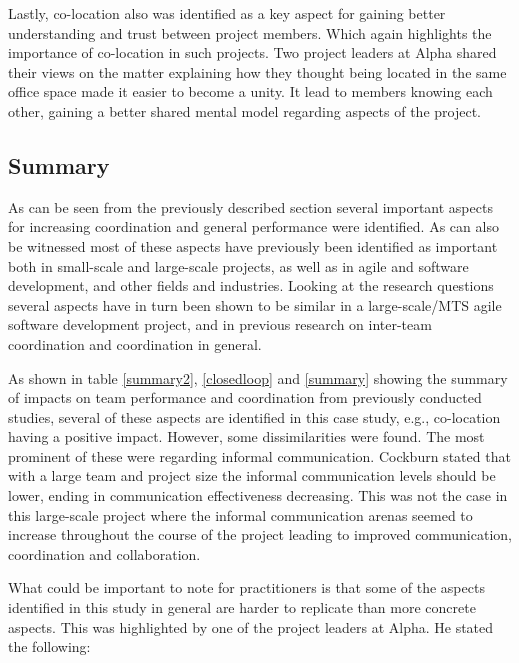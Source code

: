 Lastly, co-location also was identified as a key aspect for gaining better understanding and trust between project members. Which again highlights the importance of co-location in such projects. Two project leaders at Alpha shared their views on the matter explaining how they thought being located in the same office space made it easier to become a unity. It lead to members knowing each other, gaining a better shared mental model regarding aspects of the project.

\subsection{Summary}


As can be seen from the previously described section several important aspects for increasing coordination and general performance were identified. As can also be witnessed most of these aspects have previously been identified as important both in small-scale and large-scale projects, as well as in agile and software development, and other fields and industries. Looking at the research questions several aspects have in turn been shown to be similar in a large-scale/MTS agile software development project, and in previous research on inter-team coordination and coordination in general.

As shown in table \ref{summary2}, \ref{closedloop} and \ref{summary} showing the summary of impacts on team performance and coordination from previously conducted studies, several of these aspects are identified in this case study, e.g., co-location having a positive impact. However, some dissimilarities were found. The most prominent of these were regarding informal communication. Cockburn \cite{} stated that with a large team and project size the informal communication levels should be lower, ending in communication effectiveness decreasing. This was not the case in this large-scale project where the informal communication arenas seemed to increase throughout the course of the project leading to improved communication, coordination and collaboration.

What could be important to note for practitioners is that some of the aspects identified in this study in general are harder to replicate than more concrete aspects. This was highlighted by one of the project leaders at Alpha. He stated the following:

